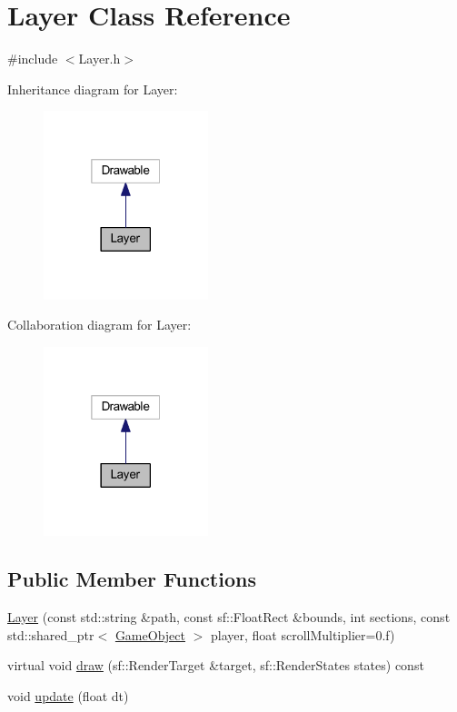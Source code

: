 \hypertarget{class_layer}{}\section{Layer Class Reference}
\label{class_layer}


{\ttfamily \#include $<$Layer.\+h$>$}



Inheritance diagram for Layer\+:
\nopagebreak
\begin{figure}[H]
\begin{center}
\leavevmode
\includegraphics[width=136pt]{class_layer__inherit__graph}
\end{center}
\end{figure}


Collaboration diagram for Layer\+:
\nopagebreak
\begin{figure}[H]
\begin{center}
\leavevmode
\includegraphics[width=136pt]{class_layer__coll__graph}
\end{center}
\end{figure}
\subsection*{Public Member Functions}
\begin{DoxyCompactItemize}
\item 
\hyperlink{class_layer_a7bb4ab89e6520ccab2fe21bae716f684}{Layer} (const std\+::string \&path, const sf\+::\+Float\+Rect \&bounds, int sections, const std\+::shared\+\_\+ptr$<$ \hyperlink{class_game_object}{Game\+Object} $>$ player, float scroll\+Multiplier=0.f)
\item 
virtual void \hyperlink{class_layer_adffe5112f908beaf0371894287d5870c}{draw} (sf\+::\+Render\+Target \&target, sf\+::\+Render\+States states) const
\item 
void \hyperlink{class_layer_afe3b5bbec379d4ea687df300c4176ae4}{update} (float dt)
\end{DoxyCompactItemize}


